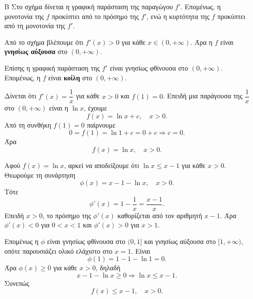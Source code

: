 \begin{thema}{Β}
Στο σχήμα δίνεται η γραφική παράσταση της παραγώγου $f'$. Επομένως, η μονοτονία της $f$ προκύπτει από το πρόσημο της $f'$, ενώ η κυρτότητα της $f$ προκύπτει από τη μονοτονία της $f'$.

\begin{center}
\end{center}

\begin{erwthma}
\item Από το σχήμα βλέπουμε ότι $f'(x)>0$ για κάθε $x\in(0,+\infty)$. Άρα η $f$ είναι \textbf{γνησίως αύξουσα} στο $(0,+\infty)$.

Επίσης η γραφική παράσταση της $f'$ είναι γνησίως φθίνουσα στο $(0,+\infty)$. Επομένως, η $f$ είναι \textbf{κοίλη} στο $(0,+\infty)$.

\item Δίνεται ότι $f'(x)=\dfrac{1}{x}$ για κάθε $x>0$ και $f(1)=0$. Επειδή μια παράγουσα της $\dfrac{1}{x}$ στο $(0,+\infty)$ είναι η $\ln x$, έχουμε
\[
f(x)=\ln x+c,\quad x>0.
\]
Από τη συνθήκη $f(1)=0$ παίρνουμε
\[
0=f(1)=\ln 1+c=0+c \Rightarrow c=0.
\]
Άρα
\[
f(x)=\ln x,\quad x>0.
\]

\item Αφού $f(x)=\ln x$, αρκεί να αποδείξουμε ότι $\ln x\leq x-1$ για κάθε $x>0$. Θεωρούμε τη συνάρτηση
\[
\phi(x)=x-1-\ln x,\quad x>0.
\]
Τότε
\[
\phi'(x)=1-\frac{1}{x}=\frac{x-1}{x}.
\]
Επειδή $x>0$, το πρόσημο της $\phi'(x)$ καθορίζεται από τον αριθμητή $x-1$. Άρα $\phi'(x)<0$ για $0<x<1$ και $\phi'(x)>0$ για $x>1$.

Επομένως η $\phi$ είναι γνησίως φθίνουσα στο $(0,1]$ και γνησίως αύξουσα στο $[1,+\infty)$, οπότε παρουσιάζει ολικό ελάχιστο στο $x=1$. Είναι
\[
\phi(1)=1-1-\ln 1=0.
\]
Άρα $\phi(x)\geq 0$ για κάθε $x>0$, δηλαδή
\[
x-1-\ln x\geq 0 \Rightarrow \ln x\leq x-1.
\]
Συνεπώς
\[
f(x)\leq x-1,\quad x>0.
\]


\end{erwthma}
\end{thema}
